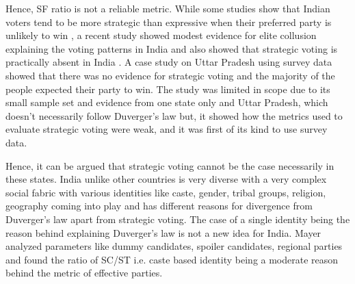 \vspace{0.3cm}

Hence, SF ratio is not a reliable metric. While some studies show that Indian voters tend to be more strategic than expressive when their preferred party is unlikely to win \citep{choi2009strategic}, a recent study showed modest evidence for elite collusion explaining the voting patterns in India and also showed that strategic voting is practically absent in India \citep{ziegfeld2021accounts}. A case study on Uttar Pradesh \citep{heath2022so} using survey data showed that there was no evidence for strategic voting and the majority of the people expected their party to win. The study was limited in scope due to its small sample set and evidence from one state only and Uttar Pradesh, which doesn't necessarily follow Duverger's law but, it showed how the metrics used to evaluate strategic voting were weak, and it was first of its kind to use survey data. 

\vspace{0.3cm}

Hence, it can be argued that strategic voting cannot be the case necessarily in these states. India unlike other countries is very diverse with a very complex social fabric with various identities like caste, gender, tribal groups, religion, geography  coming into play and has different reasons for divergence from Duverger's law apart from strategic voting. The case of a single identity being the reason behind explaining Duverger’s law is not a new idea \citep{mayer2013gross} for India. Mayer analyzed parameters like dummy candidates, spoiler candidates, regional parties  and found the ratio of SC/ST i.e. caste based identity being a moderate reason behind the metric of effective parties. 


